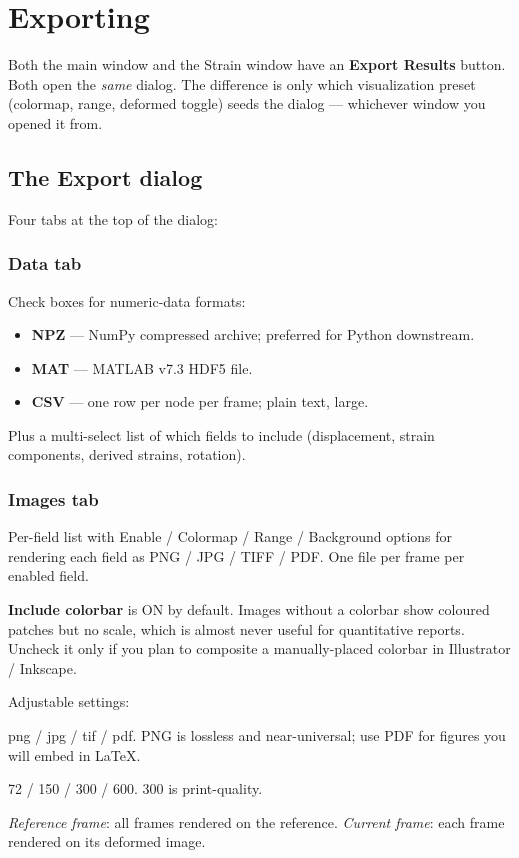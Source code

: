 \section{Exporting}
\label{sec:export}

Both the main window and the Strain window have an \textbf{Export
Results} button. Both open the \emph{same} dialog. The difference is
only which visualization preset (colormap, range, deformed toggle)
seeds the dialog --- whichever window you opened it from.

\subsection{The Export dialog}

Four tabs at the top of the dialog:

\subsubsection*{Data tab}

Check boxes for numeric-data formats:
\begin{itemize}
  \item \textbf{NPZ} --- NumPy compressed archive; preferred for
        Python downstream.
  \item \textbf{MAT} --- MATLAB v7.3 HDF5 file.
  \item \textbf{CSV} --- one row per node per frame; plain text,
        large.
\end{itemize}

Plus a multi-select list of which fields to include (displacement,
strain components, derived strains, rotation).

\subsubsection*{Images tab}

Per-field list with Enable / Colormap / Range / Background options
for rendering each field as PNG / JPG / TIFF / PDF. One file per
frame per enabled field.

\begin{tipbox}
\textbf{Include colorbar} is ON by default. Images without a
colorbar show coloured patches but no scale, which is almost never
useful for quantitative reports. Uncheck it only if you plan to
composite a manually-placed colorbar in Illustrator / Inkscape.
\end{tipbox}

Adjustable settings:
\begin{description}[leftmargin=1.2cm,style=nextline]
  \item[Image format]
    png / jpg / tif / pdf. PNG is lossless and near-universal; use
    PDF for figures you will embed in LaTeX.
  \item[DPI] 72 / 150 / 300 / 600. 300 is print-quality.
  \item[Background]
    \emph{Reference frame}: all frames rendered on the reference.
    \emph{Current frame}: each frame rendered on its deformed image.
\end{description}

